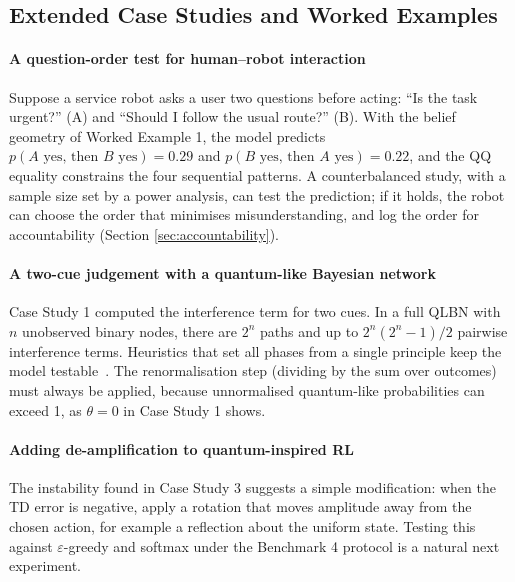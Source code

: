 \documentclass[pdflatex,sn-basic]{sn-jnl}
\begin{document}
\begin{appendices}
\section{Extended Case Studies and Worked Examples}\label{app:ext}

\paragraph{A question-order test for human--robot interaction} Suppose a service robot asks a user two questions before acting: ``Is the task urgent?'' (A) and ``Should I follow the usual route?'' (B). With the belief geometry of Worked Example 1, the model predicts $p(A\text{ yes, then }B\text{ yes}) = 0.29$ and $p(B\text{ yes, then }A\text{ yes}) = 0.22$, and the QQ equality constrains the four sequential patterns. A counterbalanced study, with a sample size set by a power analysis, can test the prediction; if it holds, the robot can choose the order that minimises misunderstanding, and log the order for accountability (Section \ref{sec:accountability}).

\paragraph{A two-cue judgement with a quantum-like Bayesian network} Case Study 1 computed the interference term for two cues. In a full QLBN with $n$ unobserved binary nodes, there are $2^n$ paths and up to $2^n(2^n - 1)/2$ pairwise interference terms. Heuristics that set all phases from a single principle keep the model testable~\citep{Moreira2016,Wichert2020}. The renormalisation step (dividing by the sum over outcomes) must always be applied, because unnormalised quantum-like probabilities can exceed 1, as $\theta = 0$ in Case Study 1 shows.

\paragraph{Adding de-amplification to quantum-inspired RL} The instability found in Case Study 3 suggests a simple modification: when the TD error is negative, apply a rotation that moves amplitude away from the chosen action, for example a reflection about the uniform state. Testing this against $\varepsilon$-greedy and softmax under the Benchmark 4 protocol is a natural next experiment.


\end{appendices}


\end{document}
